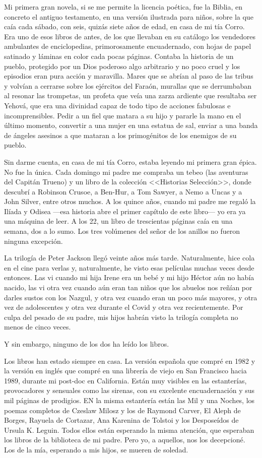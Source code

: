 Mi primera gran novela, si se me permite la licencia poética, fue la Biblia, en concreto el antiguo testamento, en una versión ilustrada para niños, sobre la que caía cada sábado, con seis, quizás siete años de edad, en casa de mi tía Corro. Era uno de esos libros de antes, de los que llevaban en su catálogo los vendedores ambulantes de enciclopedias, primorosamente encuadernado, con hojas de papel satinado y láminas en color cada pocas páginas. Contaba la historia de un pueblo, protegido por un Dios poderoso algo arbitrario y no poco cruel y los episodios eran pura acción y maravilla. Mares que se abrían al paso de las tribus y volvían a cerrarse sobre los ejércitos del Faraón, murallas que se derrumbaban al resonar las trompetas, un profeta que veía una zarza ardiente que resultaba ser Yehová, que era una divinidad capaz de todo tipo de acciones fabulosas e incomprensibles. Pedir a un fiel que matara a su hijo y pararle la mano en el último momento, convertir a una mujer en una estatua de sal, enviar a una banda de ángeles asesinos a que mataran a los primogénitos de los enemigos de su pueblo. 

Sin darme cuenta, en casa de mi tía Corro, estaba leyendo mi primera gran épica. No fue la única. Cada domingo mi padre me compraba un tebeo (las aventuras del Capitán Trueno) y un libro de la colección <<Historias Selección>>, donde descubrí a Robinson Crusoe, a Ben-Hur, a Tom Sawyer, a Nemo a Uncas y a John Silver, entre otros muchos. A los quince años, cuando mi padre me regaló la Ilíada y Odisea ---esa historia abre el primer capítulo de este libro--- yo era ya una máquina de leer. A los 22, un libro de trescientas páginas caía en una semana, dos a lo sumo. Los tres volúmenes del señor de los anillos no fueron ninguna excepción. 

La trilogía de Peter Jackson llegó veinte años más tarde. Naturalmente, hice cola en el cine para verlas y, naturalmente, he visto esas películas muchas veces desde entonces. Las vi cuando mi hija Irene era un bebé y mi hijo Héctor aún no había nacido, las vi otra vez cuando aún eran tan niños que los abuelos nos reñían por darles sustos con los Nazgul, y otra vez cuando eran un poco más mayores, y otra vez de adolescentes y otra vez durante el Covid y otra vez recientemente. Por culpa del pesado de su padre, mis hijos habrán visto la trilogía completa no menos de cinco veces.

Y sin embargo, ninguno de los dos ha leído los libros. 

Los libros han estado siempre en casa. La versión española que compré en 1982 y la versión en inglés que compré en una librería de viejo en San Francisco hacia 1989, durante mi post-doc en California. Están muy visibles en las estanterías, provocadores y sensuales como las sirenas, con su excelente encuadernación y sus mil páginas de prodigios. EN la misma estantería están las Mil y una Noches, los poemas completos de Czeslaw Milosz y los de Raymond Carver, El Aleph de Borges, Rayuela de Cortazar, Ana Karenina de Tolstoi y los Desposeídos de Ursula K. Leguin. Todos ellos están esperando la misma atención, que esperaban los libros de la biblioteca de mi padre. Pero yo, a aquellos, nos los decepcioné. Los de la mía, esperando a mis hijos, se mueren de soledad.

